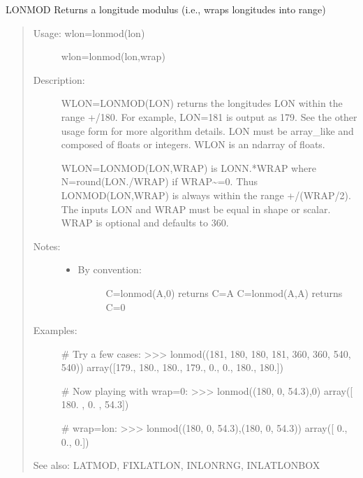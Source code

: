 \documentclass[letterpaper,10pt,english]{sphinxmanual}
\begin{document}
\begin{fulllineitems}
\label{\detokenize{infrapy.utils:infrapy.utils.latlon.lonmod}}
LONMOD    Returns a longitude modulus (i.e., wraps longitudes into range)
\begin{quote}
\begin{description}
\item[{Usage:    wlon=lonmod(lon)}] \leavevmode
wlon=lonmod(lon,wrap)

\item[{Description:}] \leavevmode
WLON=LONMOD(LON) returns the longitudes LON within the range +/\sphinxhyphen{}180.
For example, LON=181 is output as \sphinxhyphen{}179.  See the other usage form for
more algorithm details.  LON must be array\_like and composed of floats
or integers.  WLON is an ndarray of floats.

WLON=LONMOD(LON,WRAP) is LON\sphinxhyphen{}N.*WRAP where N=round(LON./WRAP) if
WRAP\textasciitilde{}=0.  Thus LONMOD(LON,WRAP) is always within the range +/\sphinxhyphen{}(WRAP/2).
The inputs LON and WRAP must be equal in shape or scalar.  WRAP is
optional and defaults to 360.

\item[{Notes:}] \leavevmode\begin{itemize}
\item {} \begin{description}
\item[{By convention:}] \leavevmode
C=lonmod(A,0) returns C=A
C=lonmod(A,A) returns C=0

\end{description}

\end{itemize}

\item[{Examples:}] \leavevmode
\# Try a few cases:
\textgreater{}\textgreater{}\textgreater{} lonmod((181, 180, \sphinxhyphen{}180, \sphinxhyphen{}181, 360, \sphinxhyphen{}360, 540, \sphinxhyphen{}540))
array({[}\sphinxhyphen{}179.,  180., \sphinxhyphen{}180.,  179.,    0.,    0.,  180., \sphinxhyphen{}180.{]})

\# Now playing with wrap=0:
\textgreater{}\textgreater{}\textgreater{} lonmod((180, 0, 54.3),0)
array({[} 180. ,    0. ,   54.3{]})

\# wrap=lon:
\textgreater{}\textgreater{}\textgreater{} lonmod((180, 0, 54.3),(180, 0, 54.3))
array({[} 0.,  0.,  0.{]})

\end{description}

See also: LATMOD, FIXLATLON, INLONRNG, INLATLONBOX
\end{quote}

\end{fulllineitems}
\end{document}
